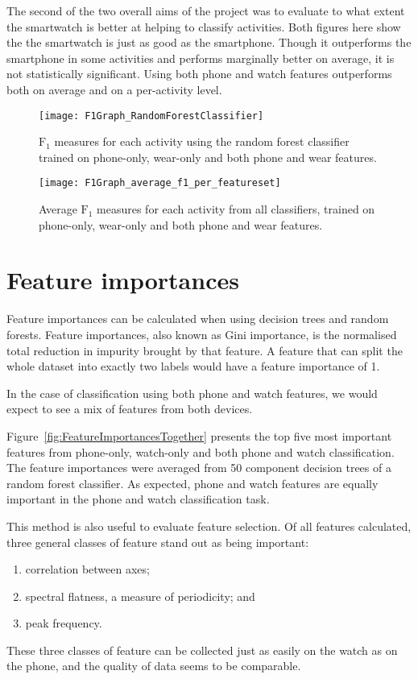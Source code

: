{{        The second of the two overall aims of the project was to evaluate to what extent the smartwatch is better at helping to classify activities. Both figures here show the the smartwatch is just as good as the smartphone. Though it outperforms the smartphone in some activities and performs marginally better on average, it is not statistically significant. Using both phone and watch features outperforms both on average and on a per-activity level.
    \begin{figure}
      \centering
      \texttt{[image: F1Graph\_RandomForestClassifier]}
      \caption{$\mathrm{F}_1$ measures for each activity using the random forest classifier trained on phone-only, wear-only and both phone and wear features.}
      \label{fig:F1Graph_RandomForestClassifier}
    \end{figure}
    \begin{figure}
      \centering
      \texttt{[image: F1Graph\_average\_f1\_per\_featureset]}
      \caption{Average $\mathrm{F}_1$ measures for each activity from all classifiers, trained on phone-only, wear-only and both phone and wear features.}
      \label{fig:F1Graph_average_f1_per_featureset}
    \end{figure}
  
  \section{Feature importances}
    Feature importances can be calculated when using decision trees and random forests. Feature importances, also known as Gini importance, is the normalised total reduction in impurity brought by that feature\cite{breiman2001random}. A feature that can split the whole dataset into exactly two labels would have a feature importance of 1.
    
    In the case of classification using both phone and watch features, we would expect to see a mix of features from both devices.
    
    Figure~\ref{fig:FeatureImportancesTogether} presents the top five most important features from phone-only, watch-only and both phone and watch classification. The feature importances were averaged from 50 component decision trees of a random forest classifier. As expected, phone and watch features are equally important in the phone and watch classification task. 
    
    This method is also useful to evaluate feature selection. Of all features calculated, three general classes of feature stand out as being important:
    \begin{enumerate}
      \item correlation between axes;
      \item spectral flatness, a measure of periodicity; and
      \item peak frequency.
    \end{enumerate}
    These three classes of feature can be collected just as easily on the watch as on the phone, and the quality of data seems to be comparable.
    
}}
